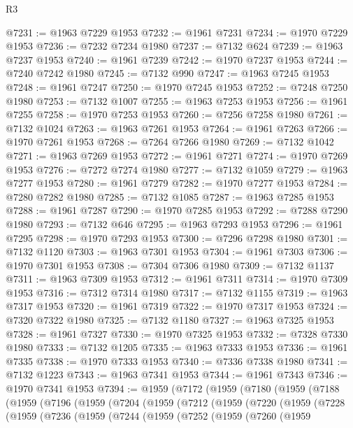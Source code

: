 \begin{lexlean}{R3}
\begin{coremodule}
@7231 := @1963 @7229 @1953
@7232 := @1961 @7231
@7234 := @1970 @7229 @1953
@7236 := @7232 @7234 @1980
@7237 := @7132 @624
@7239 := @1963 @7237 @1953
@7240 := @1961 @7239
@7242 := @1970 @7237 @1953
@7244 := @7240 @7242 @1980
@7245 := @7132 @990
@7247 := @1963 @7245 @1953
@7248 := @1961 @7247
@7250 := @1970 @7245 @1953
@7252 := @7248 @7250 @1980
@7253 := @7132 @1007
@7255 := @1963 @7253 @1953
@7256 := @1961 @7255
@7258 := @1970 @7253 @1953
@7260 := @7256 @7258 @1980
@7261 := @7132 @1024
@7263 := @1963 @7261 @1953
@7264 := @1961 @7263
@7266 := @1970 @7261 @1953
@7268 := @7264 @7266 @1980
@7269 := @7132 @1042
@7271 := @1963 @7269 @1953
@7272 := @1961 @7271
@7274 := @1970 @7269 @1953
@7276 := @7272 @7274 @1980
@7277 := @7132 @1059
@7279 := @1963 @7277 @1953
@7280 := @1961 @7279
@7282 := @1970 @7277 @1953
@7284 := @7280 @7282 @1980
@7285 := @7132 @1085
@7287 := @1963 @7285 @1953
@7288 := @1961 @7287
@7290 := @1970 @7285 @1953
@7292 := @7288 @7290 @1980
@7293 := @7132 @646
@7295 := @1963 @7293 @1953
@7296 := @1961 @7295
@7298 := @1970 @7293 @1953
@7300 := @7296 @7298 @1980
@7301 := @7132 @1120
@7303 := @1963 @7301 @1953
@7304 := @1961 @7303
@7306 := @1970 @7301 @1953
@7308 := @7304 @7306 @1980
@7309 := @7132 @1137
@7311 := @1963 @7309 @1953
@7312 := @1961 @7311
@7314 := @1970 @7309 @1953
@7316 := @7312 @7314 @1980
@7317 := @7132 @1155
@7319 := @1963 @7317 @1953
@7320 := @1961 @7319
@7322 := @1970 @7317 @1953
@7324 := @7320 @7322 @1980
@7325 := @7132 @1180
@7327 := @1963 @7325 @1953
@7328 := @1961 @7327
@7330 := @1970 @7325 @1953
@7332 := @7328 @7330 @1980
@7333 := @7132 @1205
@7335 := @1963 @7333 @1953
@7336 := @1961 @7335
@7338 := @1970 @7333 @1953
@7340 := @7336 @7338 @1980
@7341 := @7132 @1223
@7343 := @1963 @7341 @1953
@7344 := @1961 @7343
@7346 := @1970 @7341 @1953
@7394 := @1959
    (@7172
      (@1959
        (@7180
          (@1959
            (@7188
              (@1959
                (@7196
                  (@1959
                    (@7204
                      (@1959
                        (@7212
                          (@1959
                            (@7220
                              (@1959
                                (@7228
                                  (@1959
                                    (@7236
                                      (@1959
                                        (@7244
                                          (@1959
                                            (@7252
                                              (@1959
                                                (@7260
                                                  (@1959

\end{coremodule}
\end{lexlean}
